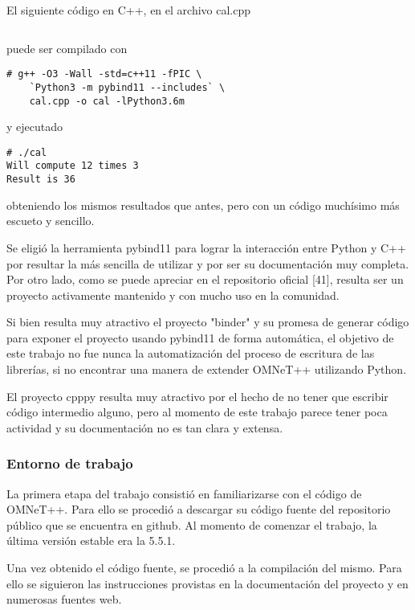 \documentclass[]{article}
\begin{document}
El siguiente código en C++, en el archivo cal.cpp

\inputminted{c}{codelistings/use_multiply_pybind.c}

puede ser compilado con

\begin{verbatim}
# g++ -O3 -Wall -std=c++11 -fPIC \
    `Python3 -m pybind11 --includes` \
    cal.cpp -o cal -lPython3.6m
\end{verbatim}

y ejecutado

\begin{verbatim}
# ./cal
Will compute 12 times 3
Result is 36
\end{verbatim}

obteniendo los mismos resultados que antes, pero con un código muchísimo más
escueto y sencillo.

Se eligió la herramienta pybind11 para lograr la interacción entre Python y C++
por resultar la más sencilla de utilizar y por ser su documentación muy
completa. Por otro lado, como se puede apreciar en el repositorio oficial [41],
resulta ser un proyecto activamente mantenido y con mucho uso en la comunidad.

Si bien resulta muy atractivo el proyecto "binder" y su promesa de generar
código para exponer el proyecto usando pybind11 de forma automática, el
objetivo de este trabajo no fue nunca la automatización del proceso de
escritura de las librerías, si no encontrar una manera de extender OMNeT++
utilizando Python.

El proyecto cpppy resulta muy atractivo por el hecho de no tener que escribir
código intermedio alguno, pero al momento de este trabajo parece tener poca
actividad y su documentación no es tan clara y extensa.

\subsubsection{Entorno de trabajo}

La primera etapa del trabajo consistió en familiarizarse con el código de
OMNeT++. Para ello se procedió a descargar su código fuente del repositorio
público que se encuentra en github. Al momento de comenzar el trabajo, la
última versión estable era la 5.5.1.

Una vez obtenido el código fuente, se procedió a la compilación del mismo. Para
ello se siguieron las instrucciones provistas en la documentación del proyecto
y en numerosas fuentes web.
\end{document}
